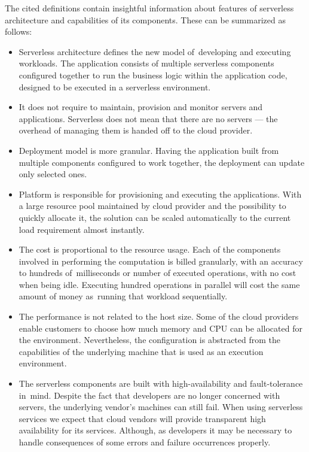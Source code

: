 The cited definitions contain insightful information about features of serverless architecture and capabilities of its components. These can be summarized as follows:

\begin{itemize}
    \item Serverless architecture defines the new model of~developing and executing workloads. The application consists of multiple serverless components configured together to run the business logic within the application code, designed to be executed in a serverless environment.
    \item It does not require to maintain, provision and monitor servers and applications. Serverless does not mean that there are no servers --- the overhead of managing them is handed off to the cloud provider.
    \item Deployment model is more granular. Having the application built from multiple components configured to work together, the deployment can update only selected ones.
    \item Platform is responsible for provisioning and executing the applications. With a large resource pool maintained by cloud provider and the possibility to quickly allocate it, the solution can be scaled automatically to the current load requirement almost instantly.
    \item The cost is proportional to the resource usage. Each of the components involved in performing the computation is billed granularly, with an accuracy to hundreds of~milliseconds or number of executed operations, with no cost when being idle. Executing hundred operations in parallel will cost the same amount of money as~running that workload sequentially.
    \item The performance is not related to the host size. Some of the cloud providers enable customers to choose how much memory and CPU can be allocated for the environment. Nevertheless, the configuration is abstracted from the capabilities of the underlying machine that is used as an execution environment.
    \item The serverless components are built with high-availability and fault-tolerance in~mind. Despite the fact that developers are no longer concerned with servers, the underlying vendor's machines can still fail. When using serverless services we expect that cloud vendors will provide transparent high availability for its services. Although, as developers it may be necessary to handle consequences of some errors and failure occurrences properly.
\end{itemize}

